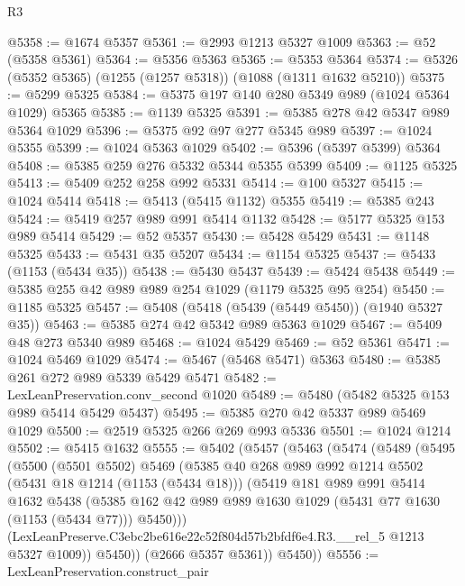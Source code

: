 \begin{lexlean}{R3}
\begin{coremodule}
@5358 := @1674 @5357
@5361 := @2993 @1213 @5327 @1009
@5363 := @52 (@5358 @5361)
@5364 := @5356 @5363
@5365 := @5353 @5364
@5374 := @5326 (@5352 @5365) (@1255 (@1257 @5318)) (@1088 (@1311 @1632 @5210))
@5375 := @5299 @5325
@5384 := @5375 @197 @140 @280 @5349 @989 (@1024 @5364 @1029) @5365
@5385 := @1139 @5325
@5391 := @5385 @278 @42 @5347 @989 @5364 @1029
@5396 := @5375 @92 @97 @277 @5345 @989
@5397 := @1024 @5355
@5399 := @1024 @5363 @1029
@5402 := @5396 (@5397 @5399) @5364
@5408 := @5385 @259 @276 @5332 @5344 @5355 @5399
@5409 := @1125 @5325
@5413 := @5409 @252 @258 @992 @5331
@5414 := @100 @5327
@5415 := @1024 @5414
@5418 := @5413 (@5415 @1132) @5355
@5419 := @5385 @243
@5424 := @5419 @257 @989 @991 @5414 @1132
@5428 := @5177 @5325 @153 @989 @5414
@5429 := @52 @5357
@5430 := @5428 @5429
@5431 := @1148 @5325
@5433 := @5431 @35 @5207
@5434 := @1154 @5325
@5437 := @5433 (@1153 (@5434 @35))
@5438 := @5430 @5437
@5439 := @5424 @5438
@5449 := @5385 @255 @42 @989 @989 @254 @1029 (@1179 @5325 @95 @254)
@5450 := @1185 @5325
@5457 := @5408 (@5418 (@5439 (@5449 @5450)) (@1940 @5327 @35))
@5463 := @5385 @274 @42 @5342 @989 @5363 @1029
@5467 := @5409 @48 @273 @5340 @989
@5468 := @1024 @5429
@5469 := @52 @5361
@5471 := @1024 @5469 @1029
@5474 := @5467 (@5468 @5471) @5363
@5480 := @5385 @261 @272 @989 @5339 @5429 @5471
@5482 := LexLeanPreservation.conv_second @1020
@5489 := @5480 (@5482 @5325 @153 @989 @5414 @5429 @5437)
@5495 := @5385 @270 @42 @5337 @989 @5469 @1029
@5500 := @2519 @5325 @266 @269 @993 @5336
@5501 := @1024 @1214
@5502 := @5415 @1632
@5555 := @5402
    (@5457
      (@5463
        (@5474
          (@5489
            (@5495
              (@5500
                (@5501 @5502)
                @5469
                (@5385
                  @40
                  @268
                  @989
                  @992
                  @1214
                  @5502
                  (@5431 @18 @1214 (@1153 (@5434 @18)))
                  (@5419
                    @181
                    @989
                    @991
                    @5414
                    @1632
                    @5438
                    (@5385
                      @162
                      @42
                      @989
                      @989
                      @1630
                      @1029
                      (@5431 @77 @1630 (@1153 (@5434 @77)))
                      @5450)))
                (LexLeanPreserve.C3ebc2be616e22c52f804d57b2bfdf6e4.R3.__rel_5 @1213 @5327 @1009))
              @5450))
          (@2666 @5357 @5361))
        @5450))
@5556 := LexLeanPreservation.construct_pair

\end{coremodule}
\end{lexlean}
